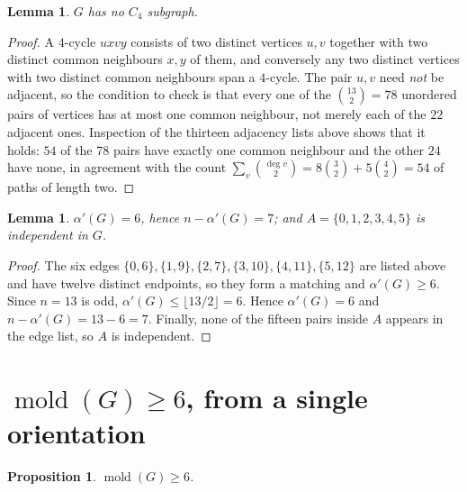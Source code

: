 \documentclass[11pt]{amsart}
\newtheorem{lemma}[theorem]{Lemma}
\newtheorem{proposition}[theorem]{Proposition}
\theoremstyle{definition}
\theoremstyle{remark}
\DeclareMathOperator{\mold}{mold}
\begin{document}
\begin{lemma}\label{lem:noC4}
$G$ has no $C_4$ subgraph.
\end{lemma}

\begin{proof}
A $4$-cycle $uxvy$ consists of two distinct vertices $u,v$ together with two
distinct common neighbours $x,y$ of them, and conversely any two distinct
vertices with two distinct common neighbours span a $4$-cycle. The pair $u,v$
need \emph{not} be adjacent, so the condition to check is that every one of the
$\binom{13}{2}=78$ unordered pairs of vertices has at most one common
neighbour, not merely each of the $22$ adjacent ones. Inspection of the
thirteen adjacency lists above shows that it holds: $54$ of the $78$ pairs have
exactly one common neighbour and the other $24$ have none, in agreement with
the count $\sum_v\binom{\deg v}{2}=8\binom32+5\binom42=54$ of paths of length
two.
\end{proof}

\begin{lemma}\label{lem:alpha}
$\alpha'(G)=6$, hence $n-\alpha'(G)=7$; and $A=\{0,1,2,3,4,5\}$ is independent
in $G$.
\end{lemma}

\begin{proof}
The six edges $\{0,6\},\{1,9\},\{2,7\},\{3,10\},\{4,11\},\{5,12\}$ are listed
above and have twelve distinct endpoints, so they form a matching and
$\alpha'(G)\ge6$. Since $n=13$ is odd, $\alpha'(G)\le\lfloor13/2\rfloor=6$.
Hence $\alpha'(G)=6$ and $n-\alpha'(G)=13-6=7$. Finally, none of the fifteen
pairs inside $A$ appears in the edge list, so $A$ is independent.
\end{proof}

\section{$\mold(G)\ge6$, from a single orientation}\label{sec:lower}

\begin{proposition}\label{prop:lower}
$\mold(G)\ge6$.
\end{proposition}
\end{document}

